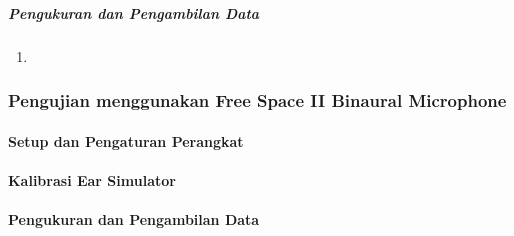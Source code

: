 \documentclass{article}
\begin{document}
	\subparagraph{Pengukuran dan Pengambilan Data}
		\begin{enumerate}
			\item 
		\end{enumerate}

	\subsubsection{Pengujian menggunakan Free Space II Binaural Microphone}
	\paragraph{Setup dan Pengaturan Perangkat}
	
	\paragraph{Kalibrasi Ear Simulator}
	
	\paragraph{Pengukuran dan Pengambilan Data}	
	
	
\end{document}
